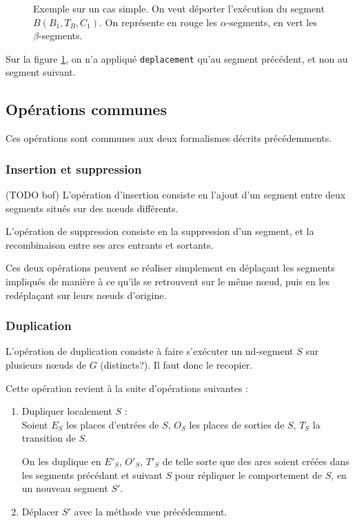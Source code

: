 \begin{figure}[h]
\centering

\caption{Exemple sur un cas simple. On veut déporter l'exécution du segment $B(B_1, T_B, C_1)$. On représente en rouge les $\alpha$-segments, en vert les $\beta$-segments.}
\label{fig:deplacementForm2}
\end{figure}

Sur la figure \ref{fig:deplacementForm2}, on n'a appliqué \texttt{deplacement} qu'au segment précédent, et non au segment suivant.

\subsection{Opérations communes}
Ces opérations sont communes aux deux formalismes décrits précédemments.

\subsubsection{Insertion et suppression}
(TODO bof)
L'opération d'insertion consiste en l'ajout d'un segment entre deux segments situés sur des nœuds différents.

L'opération de suppression consiste en la suppression d'un segment, et la recombinaison entre ses arcs entrants et sortants.

Ces deux opérations peuvent se réaliser simplement en déplaçant les segments impliqués de manière à ce qu'ils se retrouvent sur le même nœud, puis en les redéplaçant sur leurs nœuds d'origine.

\subsubsection{Duplication}
L'opération de duplication consiste à faire s'exécuter un nd-segment $S$ sur plusieurs nœuds de $G$ (distincts?). Il faut donc le recopier.

Cette opération revient à la suite d'opérations suivantes : 
\begin{enumerate}
\item Dupliquer localement $S$ : \\
		Soient $E_S$ les places d'entrées de $S$, $O_S$ les places de sorties de $S$, $T_S$ la transition de $S$.
		
		On les duplique en $E'_S$, $O'_S$, $T'_S$ de telle sorte que des arcs soient créées dans les segments précédant et suivant $S$ pour répliquer le comportement de $S$, en un nouveau segment $S'$.
\item Déplacer $S'$ avec la méthode vue précédemment.
\end{enumerate}



